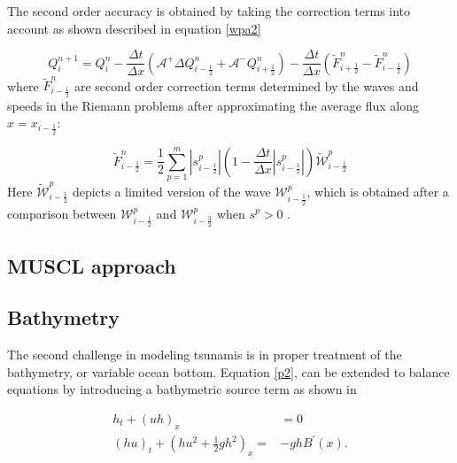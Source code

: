 \documentclass[11pt,a4paper]{article}
\newcommand{\donna}[1]{{\color{red}{#1}}}
\begin{document}
	The second order accuracy is obtained by taking the correction terms into account as shown described in equation \eqref{wpa2} \cite{barzgaran2019numerical}

\begin{equation}
	Q_{i}^{n+1} =  Q_{i}^{n} - \frac{\Delta t}{\Delta x}(\mathcal{A^{+}}\Delta 	Q_{i-\frac{1}{2}}^{n} + \mathcal{A^{-}}Q_{i+\frac{1}{2}}^{n}) -  \frac{\Delta t}{\Delta x} (\tilde{F}_{i+\frac{1}{2}}^{n} - \tilde{F}_{i-\frac{1}{2}}^{n} )
	\label{wpa2}
\end{equation}
where $\tilde{F}_{i-\frac{1}{2}}^{n} $ are second order correction terms determined by the waves and speeds in the Riemann problems after approximating the average flux along  $x = x_{i - \frac{1}{2}}$:

\begin{equation}
	\tilde{F}_{i-\frac{1}{2}}^{n} = \frac{1}{2} \sum_{p=1}^{m}  |s_{i- \frac{1}{2}}^{p}| \left( 1 - \frac{\Delta t}{\Delta x} |s_{i- \frac{1}{2}}^{p}|\right) \tilde{\mathcal{W}}_{i-\frac{1}{2}}^{p} 
	\label{wpa13}
\end{equation}
Here $\tilde{\mathcal{W}}_{i-\frac{1}{2}}^{p} $ depicts a limited version of the wave $\mathcal{W}_{i-\frac{1}{2}}^{p} $, which is obtained after a comparison between $\mathcal{W}_{i-\frac{1}{2}}^{p} $ and $\mathcal{W}_{i-\frac{3}{2}}^{p} $ when $s^{p} >0$ \cite{ba-le-mi-ro:2003}.\\
	
	\subsection{MUSCL approach}
	\donna{Either you talk about general MUSCL schemes or you move this to a section on wetting and drying. }
	
	\subsection{Bathymetry}
	The second challenge in modeling tsunamis is in proper treatment of the bathymetry, or variable ocean bottom. 
	Equation \eqref{p2}, can be extended to balance equations by introducing a bathymetric source term as shown in 

		\begin{equation}
		\begin{aligned}
			h_{t} + (uh)_x &= 0 \\
			(hu)_t + \left(hu^{2} + \frac{1}{2}gh^{2} \right)_x =& -ghB^{\prime}(x).
			\label{bst}
		\end{aligned}
	\end{equation}
\end{document}
